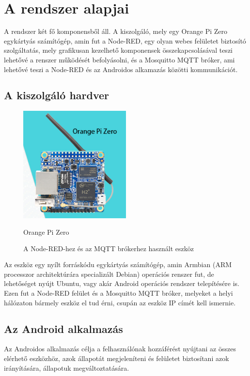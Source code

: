 \documentclass[
]{thesis-ekf}
\theoremstyle{definition}
\theoremstyle{remark}
\begin{document}
\chapter{A rendszer alapjai}
A rendszer két fő komponensből áll. A kiszolgáló, mely egy Orange Pi Zero egykártyás számítógép, amin fut a Node-RED, egy olyan webes felületet biztosító szolgáltatás, mely grafikusan kezelhető komponensek összekapcsolásával teszi lehetővé a renszer működését befolyásolni, és a Mosquitto MQTT bróker, ami lehetővé teszi a Node-RED\cite{nodeRed} és az Androidos alkamazás közötti kommunikációt.

\section{A kiszolgáló hardver}
\begin{figure}
	\includegraphics[width=0.5\textwidth]{images/OPIZero.png}
	\caption{Orange Pi Zero\cite{orange}}
	\caption{A Node-RED-hez és az MQTT brókerhez használt eszköz}
\end{figure}	
Az eszköz egy nyílt forráskódu egykártyás számítógép, amin Armbian\cite{armbian} (ARM processzor architektúrára specializált Debian) operációs renszer fut, 
de lehetőséget nyújt Ubuntu, vagy akár Android operációs rendszer telepítésére is. Ezen fut a Node-RED felület és a Mosquitto MQTT bróker, 
melyeket a helyi hálózaton bármely eszköz el tud érni, csupán az eszköz IP címét kell ismernie.

\section{Az Android alkalmazás}
Az Androidos alkalmazás célja a felhasználónak hozzáférést nyújtani az összes elérhető eszközhöz, 
azok állapotát megjeleníteni és felületet biztosítani azok irányítására, állapotuk megváltoztatására. 
\end{document}
